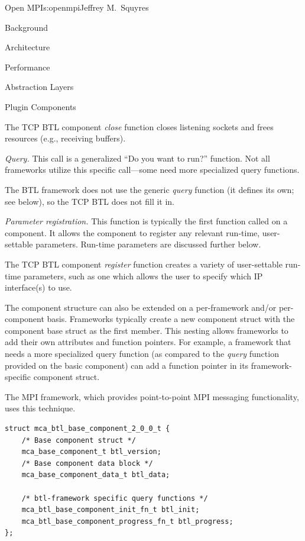 \begin{aosachapter}{Open MPI}{s:openmpi}{Jeffrey M.\ Squyres}
\begin{aosasect1}{Background}
\begin{aosasect1}{Architecture}
\begin{aosasect2}{Performance}
\begin{aosasect2}{Abstraction Layers}
\begin{aosasect2}{Plugin Components}
\begin{aosaitemize}
  The TCP BTL component \emph{close} function closes listening sockets
  and frees resources (e.g., receiving buffers).

\item \emph{Query.} This call is a generalized ``Do you want to run?''
  function.  Not all frameworks utilize this specific call---some
  need more specialized query functions.

  The BTL framework does not use the generic \emph{query} function (it
  defines its own; see below), so the TCP BTL does not fill it in.

\item \emph{Parameter registration.} This function is typically the
  first function called on a component.  It allows the component to
  register any relevant run-time, user-settable parameters.  Run-time
  parameters are discussed further below.


  The TCP BTL component \emph{register} function creates a variety of
  user-settable run-time parameters, such as one which allows the
  user to specify which IP interface(s) to use.
\end{aosaitemize}

The component structure can also be extended on a per-framework and/or
per-component basis.  Frameworks typically create a new component
struct with the component base struct as the first member.
%
This nesting allows frameworks to add their own attributes and
function pointers.  
%
For example, a framework that needs a more specialized query function
(as compared to the \emph{query} function provided on the basic
component) can add a function pointer in its framework-specific
component struct.

The MPI  framework, which provides point-to-point MPI
messaging functionality, uses this technique.

\begin{verbatim}
struct mca_btl_base_component_2_0_0_t {
    /* Base component struct */
    mca_base_component_t btl_version;
    /* Base component data block */
    mca_base_component_data_t btl_data;

    /* btl-framework specific query functions */
    mca_btl_base_component_init_fn_t btl_init;
    mca_btl_base_component_progress_fn_t btl_progress;
};
\end{verbatim}


\end{aosasect2}
\end{aosasect2}
\end{aosasect2}
\end{aosasect1}
\end{aosasect1}
\end{aosachapter}
